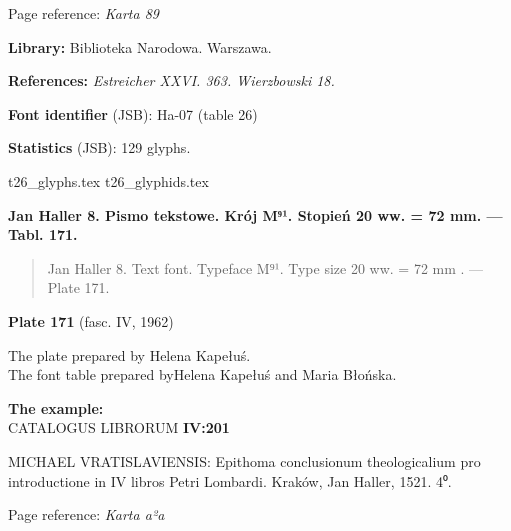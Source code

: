 \documentclass[12pt]{article}
\newcommand{\bg}{\begingl}
\newcommand{\pismoPL}[1]{{\relsize{2}\Junicode\textbf{#1}}}
\newcommand{\pismoEN}[1]{{\relsize{1}\Junicode\begin{quote}#1\end{quote}}}
\newcommand{\plate}[3]{\textbf{Plate #1} (fasc. #2, #3)}
\newcommand{\exampleBib}[1]{{\relsize{2}\Junicode\textbf{The
      example:}\\[2ex] CATALOGUS LIBRORUM \textbf{#1}}}
\newcommand{\exampleDesc}[1]{{\relsize{0}\Junicode#1}}
\newcommand{\exampleDig}[1]{{\relsize{0}\Junicode \textbf{Digitization(s) [JSB]:} #1}}
\newcommand{\exampleLib}[1]{{\relsize{0}\Junicode \textbf{Library:} #1}}
\newcommand{\examplePL}[1]{}
\newcommand{\exampleEN}[1]{}
\newcommand{\fontID}[2]{{\relsize{1}\Junicode\textbf{Font identifier} (JSB): #1 (table #2)}}
\newcommand{\fontstat}[1]{{\relsize{1}\Junicode\textbf{Statistics} (JSB): #1 glyphs.}}
\newcommand{\exampleRef}[1]{{\relsize{0}\Junicode \textbf{References:} #1}}
\newcommand{\examplePage}[1]{{Page reference: \relsize{0}\Junicode#1}}
\begin{document}
\medskip
\examplePage{\textit{Karta 89}}

  \bigskip
\exampleLib{Biblioteka Narodowa. Warszawa.}


\bigskip
\exampleRef{\textit{Estreicher XXVI. 363. Wierzbowski 18.}}


  
\bigskip

    \examplePL{Pismo 4: naglówek. [Pismo 7: tekst - JSB]}

    \medskip

    \exampleEN{Font 4: the header [Font 7: the text - JSB]}


\bigskip


\fontID{Ha-07}{26}

\fontstat{129}

  {t26_glyphs.tex}
  {t26_glyphids.tex}

 

 \newpage



  \pismoPL{Jan Haller 8. Pismo tekstowe. Krój M⁹¹. Stopień 20 ww. = 72 mm. — Tabl. 171.}
  
\pismoEN{Jan Haller 8. Text font. Typeface M⁹¹. Type size 20 ww. =
    72 mm . — Plate 171.}

\plate{171}{IV}{1962}

The plate prepared by Helena Kapełuś.\\
The font table prepared byHelena Kapełuś and Maria Błońska.

\bigskip

\exampleBib{IV:201}

\bigskip


\exampleDesc{MICHAEL VRATISLAVIENSIS: Epithoma conclusionum
  theologicalium pro introductione in IV libros Petri
  Lombardi. Kraków, Jan Haller, 1521. 4⁰.}
  

\medskip
\examplePage{\textit{Karta a²a}}
\end{document}
